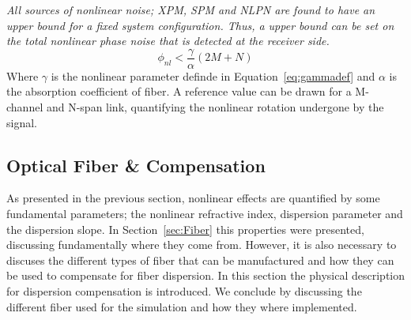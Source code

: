         
\begin{tcolorbox}[title= Bound Nonlinear Phase Shift ]
\emph{All sources of nonlinear noise; XPM, SPM and NLPN are found to have an upper bound for a fixed system configuration. Thus, a upper bound can be set on the total nonlinear phase noise that is detected at the receiver side.  }
\begin{equation}
\phi_{nl}<\frac{\gamma}{\alpha}\left (2M+N\right )
\end{equation}
Where $\gamma$ is the nonlinear parameter definde in Equation~\ref{eq:gammadef} and $\alpha$ is the absorption coefficient of fiber. A reference value can be drawn for a M-channel and N-span link, quantifying the nonlinear rotation undergone by the signal.  
\end{tcolorbox}

\subsection{Optical Fiber \& Compensation }
As presented in the previous section, nonlinear effects are quantified by some fundamental parameters; the  nonlinear refractive index, dispersion parameter and the dispersion slope. In Section~\ref{sec:Fiber} this properties were presented, discussing fundamentally where they come from. However, it is also necessary to discuses the different types of fiber that can be manufactured and how they can be used to compensate for fiber dispersion.  In this section the physical description for  dispersion compensation is introduced. We conclude by discussing the different fiber used for the simulation and how they where implemented.    
